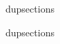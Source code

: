\begin{zsection}
\SECTION dupsections
\end{zsection}
\begin{zsection}
\SECTION dupsections
\end{zsection}
